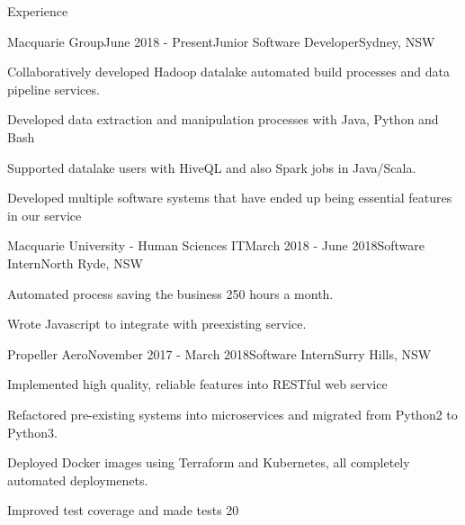 \documentclass{resume} %
\begin{document}

\begin{rSection}{Experience}


    \begin{rSubsection}{Macquarie Group}{June 2018 - Present}{Junior Software Developer}{Sydney, NSW}
    \item Collaboratively developed Hadoop datalake automated build processes and data pipeline services.
    \item Developed data extraction and manipulation processes with Java, Python and Bash
    \item Supported datalake users with HiveQL and also Spark jobs in Java/Scala.
    \item Developed multiple software systems that have ended up being essential features in our service
    \end{rSubsection}
    
    \begin{rSubsection}{Macquarie University - Human Sciences IT}{March 2018 - June 2018}{Software Intern}{North Ryde, NSW}
    \item Automated process saving the business 250 hours a month.
    \item Wrote Javascript to integrate with preexisting service.
    \end{rSubsection}
    
    \begin{rSubsection}{Propeller Aero}{November 2017 - March 2018}{Software Intern}{Surry Hills, NSW}
    \item Implemented high quality, reliable features into RESTful web service
    \item Refactored pre-existing systems into microservices and migrated from Python2 to Python3. 
    \item Deployed Docker images using Terraform and Kubernetes, all completely automated deploymenets.
    \item Improved test coverage and made tests 20%
    \end{rSubsection}
    
    \end{rSection}
    
    
\end{document}
